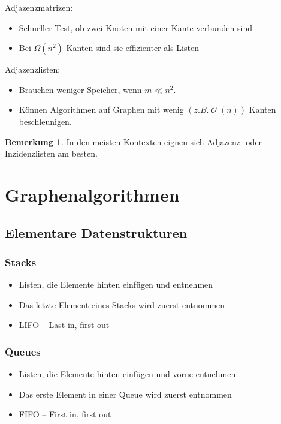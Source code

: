 \documentclass[a4paper,12pt]{article}
\DeclareMathOperator{\BigO}{\mathcal O}
\theoremstyle{definition}
\newtheorem*{bemerkung}{Bemerkung}
\begin{document}
	Adjazenzmatrizen:
	\begin{itemize}
		\item Schneller Test, ob zwei Knoten mit einer Kante verbunden sind
		\item Bei $\Omega(n^2)$ Kanten sind sie effizienter als Listen
	\end{itemize}
	Adjazenzlisten:
	\begin{itemize}
		\item Brauchen weniger Speicher, wenn $m \ll n^2$.
		\item Können Algorithmen auf Graphen mit wenig $(z. B. \BigO(n))$ Kanten beschleunigen.
	\end{itemize}
	\begin{bemerkung}
		In den meisten Kontexten eignen sich Adjazenz- oder Inzidenzlisten am besten.
	\end{bemerkung}
	\section{Graphenalgorithmen}
	\subsection{Elementare Datenstrukturen}
	\subsubsection*{Stacks}
	\begin{itemize}
		\item Listen, die Elemente hinten einfügen und entnehmen
		\item Das letzte Element eines Stacks wird zuerst entnommen
		\item LIFO -- Last in, first out
	\end{itemize}
	\subsubsection*{Queues}
	\begin{itemize}
		\item Listen, die Elemente hinten einfügen und vorne entnehmen
		\item Das erste Element in einer Queue wird zuerst entnommen
		\item FIFO -- First in, first out
	\end{itemize}
\end{document}
